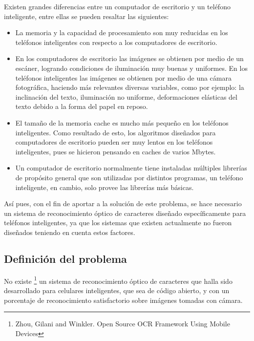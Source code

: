 \documentclass[a4paper, 11pt, oneside]{article}
\begin{document}
	Existen grandes diferencias entre un computador de escritorio y un teléfono inteligente, entre ellas se pueden resaltar las siguientes:
	\begin{itemize}
	\item La memoria y la capacidad de procesamiento son muy reducidas en los teléfonos inteligentes con respecto a los computadores de escritorio.

	\item En los computadores de escritorio las imágenes se obtienen por medio de un escáner, logrando condiciones de iluminación muy buenas y uniformes. En los teléfonos inteligentes las imágenes se obtienen por medio de una cámara fotográfica, haciendo más relevantes diversas variables, como por ejemplo: la inclinación del texto, iluminación no uniforme, deformaciones elásticas del texto debido a la forma del papel en reposo.

	\item El tamaño de la memoria cache es mucho más pequeño en los teléfonos inteligentes. Como resultado de esto, los algoritmos diseñados para computadores de escritorio pueden ser muy lentos en los teléfonos inteligentes, pues se hicieron pensando en caches de varios Mbytes.

	\item Un computador de escritorio normalmente tiene instaladas múltiples librerías de propósito general que son utilizadas por distintos programas, un teléfono inteligente, en cambio, solo provee las librerías más básicas.
	\end{itemize}

	Así pues, con el fin de aportar a la solución de este problema, se hace necesario un sistema de reconocimiento óptico de caracteres diseñado específicamente para teléfonos inteligentes, ya que los sistemas que existen actualmente no fueron diseñados teniendo en cuenta estos factores. 
	
	\subsection{Definición del problema}
	No existe \footnote{Zhou, Gilani and Winkler. Open Source OCR Framework Using Mobile Devices}
    un sistema de reconocimiento óptico de caracteres que halla sido desarrollado para 
    celulares inteligentes, que sea de código abierto, y con un porcentaje de reconocimiento 
    satisfactorio sobre imágenes tomadas con cámara.
	
	\clearpage
\end{document}
